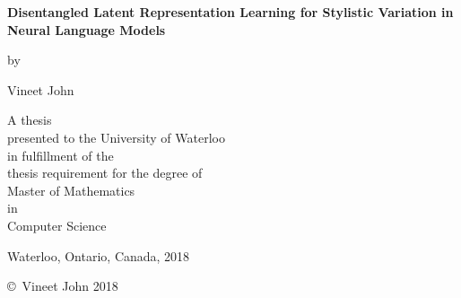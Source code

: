 \pagestyle{empty}

\begin{titlepage}
	\begin{center}
		\vspace*{1.0cm}

		\Huge
		{\bf Disentangled Latent Representation Learning for Stylistic Variation in Neural Language Models}

		\vspace*{1.0cm}

		\normalsize
		by \\

		\vspace*{1.0cm}

		\Large
		Vineet John \\

		\vspace*{3.0cm}

		\normalsize
		A thesis \\
		presented to the University of Waterloo \\
		in fulfillment of the \\
		thesis requirement for the degree of \\
		Master of Mathematics \\
		in \\
		Computer Science \\

		\vspace*{2.0cm}

		Waterloo, Ontario, Canada, 2018 \\

		\vspace*{1.0cm}

		\copyright\ Vineet John 2018 \\
	\end{center}
\end{titlepage}

\pagestyle{plain}
\setcounter{page}{2}

\cleardoublepage %

